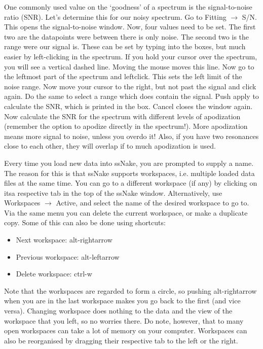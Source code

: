 \documentclass[11pt,a4paper]{article}
\begin{document}
One commonly used value on the `goodness' of a spectrum is the signal-to-noise ratio (SNR). Let's determine this for our noisy spectrum. Go to Fitting $\rightarrow$ S/N. This opens the signal-to-noise window. Now, four values need to be set. The first two are the datapoints were between there is only noise. The second two is the range were our signal is. These can be set by typing into the boxes, but much easier by left-clicking in the spectrum. If you hold your cursor over the spectrum, you will see a vertical dashed line. Moving the mouse moves this line. Now go to the leftmost part of the spectrum and leftclick. This sets the left limit of the noise range. Now move your cursor to the right, but not past the signal and click again. Do the same to select a range which does contain the signal. Push apply to calculate the SNR, which is printed in the box. Cancel closes the window again. Now calculate the SNR for the spectrum with different levels of apodization (remember the option to apodize directly in the spectrum!). More apodization means more signal to noise, unless you overdo it! Also, if you have two resonances close to each other, they will overlap if to much apodization is used.


\begin{tcolorbox}[breakable,colback=green!5,colframe=MyGreenD,title=\large ssNake workspaces,boxrule=2mm,colback=MyGreenD!30!white]
Every time you load new data into ssNake, you are prompted to supply a name. The reason for this is that ssNake supports workspaces, i.e. multiple loaded data files at the same time. You can go to a different workspace (if any) by clicking on itsa respective tab in the top of the ssNake window. Alternatively, use Workspaces $\rightarrow$ Active, and select the name of the desired workspace to go to. Via the same menu you can delete the current workspace, or make a duplicate copy. Some of this can also be done using shortcuts:
\begin{itemize}
\item Next workspace: alt-rightarrow
\item Previous workspace: alt-leftarrow
\item Delete workspace: ctrl-w
\end{itemize}
Note that the workspaces are regarded to form a circle, so pushing alt-rightarrow when you are in the last workspace makes you go back to the first (and vice versa). Changing workspace does nothing to the data and the view of the workspace that you left, so no worries there. Do note, however, that to many open workspaces can take a lot of memory on your computer. Workspaces can also be reorganised by dragging their respective tab to the left or the right.
\end{tcolorbox}
\end{document}
